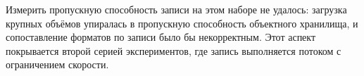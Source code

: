 Измерить пропускную способность записи на этом наборе не удалось: загрузка крупных
объёмов упиралась в пропускную способность объектного хранилища, и сопоставление
форматов по записи было бы некорректным. Этот аспект покрывается второй серией
экспериментов, где запись выполняется потоком с ограничением скорости.
